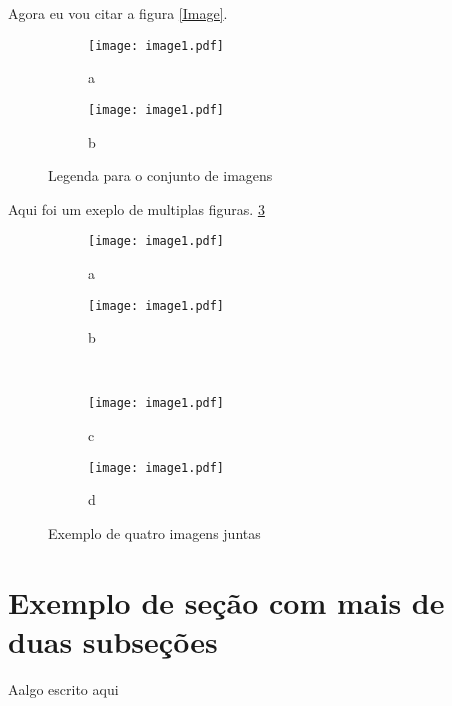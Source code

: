 \documentclass[12pt,twoside,a4paper]{article}
\numberwithin{equation}{section}
\begin{document}
Agora eu vou citar a figura \ref{Image}.

    \begin{figure}[H]

    \begin{subfigure}{.5\textwidth}
    \centering
    \texttt{[image: image1.pdf]}
    \caption{a}
    \label{fig:sfig1}
    \end{subfigure}%
    \begin{subfigure}{.5\textwidth}
    \centering
    \texttt{[image: image1.pdf]}
    \caption{b}
    \label{fig:sfig2}
    \end{subfigure}

    \caption{Legenda para o conjunto de imagens}
    \label{aloha}
    \end{figure}

    Aqui foi um exeplo de multiplas figuras. \ref{aloha}

    \begin{figure}[H]

        \begin{subfigure}{.5\textwidth}
        \centering
        \texttt{[image: image1.pdf]}
        \caption{a}
        \label{fig:sfig1}
        \end{subfigure}%
        \begin{subfigure}{.5\textwidth}
        \centering
        \texttt{[image: image1.pdf]}
        \caption{b}
        \label{fig:sfig2}
        \end{subfigure}
        \\
        \begin{subfigure}{.5\textwidth}
        \centering
        \texttt{[image: image1.pdf]}
        \caption{c}
        \label{fig:sfig1}
        \end{subfigure}%
        \begin{subfigure}{.5\textwidth}
        \centering
        \texttt{[image: image1.pdf]}
        \caption{d}
        \label{fig:sfig2}
        \end{subfigure}

    \caption{Exemplo de quatro imagens juntas}
    \label{quatro}
    \end{figure}

\section{Exemplo de seção com mais de duas subseções}
Aalgo escrito aqui
\end{document}
